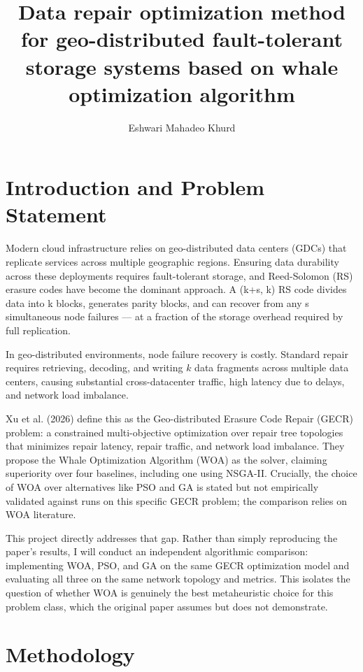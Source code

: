 \documentclass[sigconf]{acmart}
\title{Data repair optimization method for geo-distributed fault-tolerant storage systems based on whale optimization algorithm}
\author{Eshwari Mahadeo Khurd}
\affiliation{
\institution{University of California, Irvine}
\city{Irvine}
\state{California}
\country{USA}
}
\begin{document}
\maketitle



\section{Introduction and Problem Statement}

Modern cloud infrastructure relies on geo-distributed data centers (GDCs) that replicate services across multiple geographic regions. Ensuring data durability across these deployments requires fault-tolerant storage, and Reed-Solomon (RS) erasure codes have become the dominant approach. A (k+s, k) RS code divides data into k blocks, generates parity blocks, and can recover from any s simultaneous node failures — at a fraction of the storage overhead required by full replication.


In geo-distributed environments, node failure recovery is costly. Standard repair requires retrieving, decoding, and writing $k$ data fragments across multiple data centers, causing substantial cross-datacenter traffic, high latency due to delays, and network load imbalance.

Xu et al. (2026) define this as the Geo-distributed Erasure Code Repair (GECR) problem: a constrained multi-objective optimization over repair tree topologies that minimizes repair latency, repair traffic, and network load imbalance. They propose the Whale Optimization Algorithm (WOA) as the solver, claiming superiority over four baselines, including one using NSGA-II. Crucially, the choice of WOA over alternatives like PSO and GA is stated but not empirically validated against runs on this specific GECR problem; the comparison relies on WOA literature.


This project directly addresses that gap. Rather than simply reproducing the paper's results, I will conduct an independent algorithmic comparison: implementing WOA, PSO, and GA on the same GECR optimization model and evaluating all three on the same network topology and metrics. This isolates the question of whether WOA is genuinely the best metaheuristic choice for this problem class, which the original paper assumes but does not demonstrate.

\section{Methodology}
\end{document}
